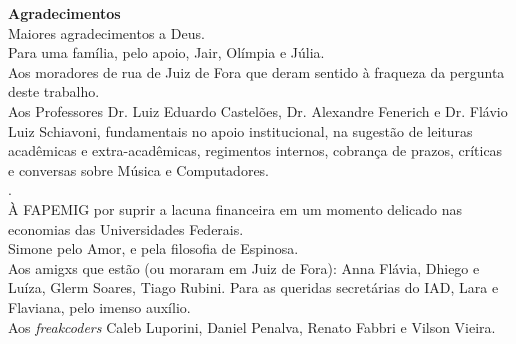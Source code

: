 \newpage
\begin{flushright}
\huge{\textbf{Agradecimentos}}
\ \\
\small{Maiores agradecimentos a Deus.  
\ \\
Para uma família, pelo apoio, Jair, Olímpia e Júlia. 
\ \\
Aos moradores de rua de Juiz de Fora que deram sentido à fraqueza da pergunta deste trabalho.
\ \\
Aos Professores Dr. Luiz Eduardo Castelões, Dr. Alexandre Fenerich e Dr. Flávio Luiz Schiavoni, fundamentais no apoio institucional, na sugestão de leituras acadêmicas e extra-acadêmicas, regimentos internos, cobrança de prazos, críticas e  conversas sobre Música e Computadores.
\ \\.
\ \\
À FAPEMIG por suprir a lacuna financeira em um momento delicado nas economias das Universidades Federais.
\\
Simone pelo Amor, e pela filosofia de Espinosa.
\ \\
Aos amigxs que estão (ou moraram em Juiz de Fora): Anna Flávia, Dhiego e Luíza, Glerm Soares, Tiago Rubini. Para as queridas secretárias do IAD, Lara e Flaviana, pelo imenso auxílio. 
\ \\
Aos \emph{freakcoders} Caleb Luporini, Daniel Penalva, Renato Fabbri e Vilson Vieira.}
\end{flushright}

\newpage